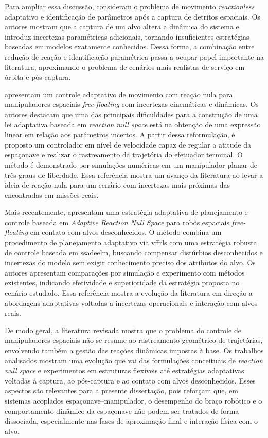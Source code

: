 Para ampliar essa discussão, \cite{nguyenhuynh2013adaptive} consideram o problema de movimento \textit{reactionless} adaptativo e identificação de parâmetros após a captura de detritos espaciais. Os autores mostram que a captura de um alvo altera a dinâmica do sistema e introduz incertezas paramétricas adicionais, tornando insuficientes estratégias baseadas em modelos exatamente conhecidos. Dessa forma, a combinação entre redução de reação e identificação paramétrica passa a ocupar papel importante na literatura, aproximando o problema de cenários mais realistas de serviço em órbita e pós-captura.

\cite{xu2016adaptive} apresentam um controle adaptativo de movimento com reação nula para manipuladores espaciais \textit{free-floating} com incertezas cinemáticas e dinâmicas. Os autores destacam que uma das principais dificuldades para a construção de uma lei adaptativa baseada em \textit{reaction null space} está na obtenção de uma expressão linear em relação aos parâmetros incertos. A partir dessa reformulação, é proposto um controlador em nível de velocidade capaz de regular a atitude da espaçonave e realizar o rastreamento da trajetória do efetuador terminal. O método é demonstrado por simulações numéricas em um manipulador planar de três graus de liberdade. Essa referência mostra um avanço da literatura ao levar a ideia de reação nula para um cenário com incertezas mais próximas das encontradas em missões reais.

Mais recentemente, \cite{ye2019adaptive} apresentam uma estratégia adaptativa de planejamento e controle baseada em \textit{Adaptive Reaction Null Space} para robôs espaciais \textit{free-floating} em contato com alvos desconhecidos. O método combina um procedimento de planejamento adaptativo via \gls{vffrls} com uma estratégia robusta de controle baseada em \gls{ssadeelm}, buscando compensar distúrbios desconhecidos e incertezas do modelo sem exigir conhecimento preciso dos atributos do alvo.
Os autores apresentam comparações por simulação e experimento com métodos existentes, indicando efetividade e superioridade da estratégia proposta no cenário estudado. Essa referência mostra a evolução da literatura em direção a abordagens adaptativas voltadas a incertezas operacionais e interação com alvos reais.

De modo geral, a literatura revisada mostra que o problema do controle de manipuladores espaciais não se resume ao rastreamento geométrico de trajetórias, envolvendo também a gestão das reações dinâmicas impostas à base. Os trabalhos analisados mostram uma evolução que vai das formulações conceituais de \textit{reaction null space} e experimentos em estruturas flexíveis até estratégias adaptativas voltadas à captura, ao pós-captura e ao contato com alvos desconhecidos.
Esses aspectos são relevantes para a presente dissertação, pois reforçam que, em sistemas acoplados espaçonave--manipulador, o desempenho do braço robótico e o comportamento dinâmico da espaçonave não podem ser tratados de forma dissociada, especialmente nas fases de aproximação final e interação física com o alvo.
